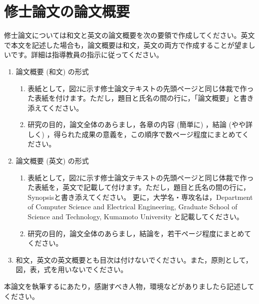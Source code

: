 \documentclass{kupaper}
\begin{document}

\chapter{修士論文の論文概要}
修士論文については和文と英文の論文概要を次の要領で作成してください。英文で本文を記述した場合も，論文概要は和文，英文の両方で作成することが望ましいです。詳細は指導教員の指示に従ってください。

\begin{enumerate}[1.]
	\item 論文概要 (和文) の形式
	      \begin{enumerate}[(1)]
	      	\item 表紙として，図2に示す修士論文テキストの先頭ページと同じ体裁で作った表紙を付けます。ただし，題目と氏名の間の行に，「論文概要」と書き添えてください。
	      	\item 研究の目的，論文全体のあらまし，各章の内容 (簡単に) ，結論 (やや詳しく) ，得られた成果の意義を，この順序で数ページ程度にまとめてください。
	      \end{enumerate}
	\item 論文概要 (英文) の形式
	      \begin{enumerate}[(1)]
	      	\item 表紙として，図2に示す修士論文テキストの先頭ページと同じ体裁で作った表紙を，英文で記載して付けます。ただし，題目と氏名の間の行に，Synopsisと書き添えてください。
	      	      更に，大学名・専攻名は，Department of Computer Science and Electrical Engineering, Graduate School of Science and Technology, Kumamoto University と記載してください。
	      	\item 研究の目的，論文全体のあらまし，結論を，若干ページ程度にまとめてください。
	      \end{enumerate}
	\item 和文，英文の英文概要とも目次は付けないでください。また，原則として，図，表，式を用いないでください。
\end{enumerate}


\begin{thanks}
	本論文を執筆するにあたり，感謝すべき人物，環境などがありましたら記述してください。
\end{thanks}



\end{document}
